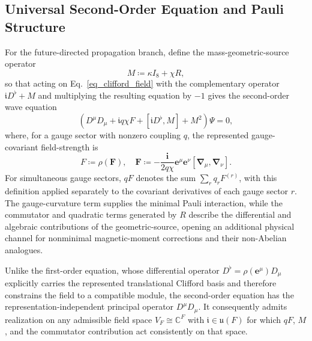 \subsection{Universal Second-Order Equation and Pauli Structure}
\label{ch_quadratic_pauli_structure}
For the future-directed propagation branch, define the mass-geometric-source operator
\begin{equation}
    M \coloneqq \kappa I_{8} + \chi R,
\end{equation}
so that acting on Eq.~\eqref{eq_clifford_field} with the complementary operator $\mathfrak{i}D^{\flat} + M$ and multiplying the resulting equation by $-1$ gives the second-order wave equation
\begin{equation}\label{eq_2order_full_source}
    \left(D^{\mu}D_{\mu} + \mathfrak{i}q \chi F + \left[\mathfrak{i}D^{\flat}, M\right] + M^{2}\right)\Psi = 0,
\end{equation}
where, for a gauge sector with nonzero coupling $q$, the represented gauge-covariant field-strength is
\begin{equation}\label{eq_general_field_strength_bivector}
    F \coloneqq \rho(\mathbf{F}),\quad \mathbf{F} \coloneqq -\frac{\mathbf{i}}{2q\chi}\mathbf{e}^{\mu}\mathbf{e}^{\nu}[\boldsymbol{\nabla}_{\mu}, \boldsymbol{\nabla}_{\nu}].
\end{equation}
For simultaneous gauge sectors, $qF$ denotes the sum $\sum_{r}q_{r}F^{(r)}$, with this definition applied separately to the covariant derivatives of each gauge sector $r$. The gauge-curvature term supplies the minimal Pauli interaction, while the commutator and quadratic terms generated by $R$ describe the differential and algebraic contributions of the geometric-source, opening an additional physical channel for nonminimal magnetic-moment corrections and their non-Abelian analogues.

Unlike the first-order equation, whose differential operator $D^{\flat} = \rho(\mathbf{e}^{\mu})D_{\mu}$ explicitly carries the represented translational Clifford basis and therefore constrains the field to a compatible module, the second-order equation has the representation-independent principal operator $D^{\mu}D_{\mu}$. It consequently admits realization on any admissible field space $V_{F} \cong \mathbb{C}^{F}$ with $\mathfrak{i} \in \mathfrak{u}(F)$ for which $qF$, $M$, and the commutator contribution act consistently on that space.

